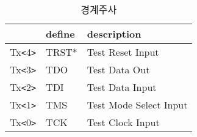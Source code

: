 %
%
\begin{table}[htbp]
\caption{경계주사}\label{table:jtag}
   \begin{center}
   \begin{tabular}{|l|l|l|} \hline
	& define & description \\
\hline \hline
	Tx{\tt <}4{\tt >} & TRST* & Test Reset Input \\
	Tx{\tt <}3{\tt >} & TDO   & Test Data Out \\
	Tx{\tt <}2{\tt >} & TDI   & Test Data Input \\
	Tx{\tt <}1{\tt >} & TMS   & Test Mode Select Input \\
	Tx{\tt <}0{\tt >} & TCK   & Test Clock Input \\
\hline
   \end{tabular}
   \end{center}
\end{table}
%
%
